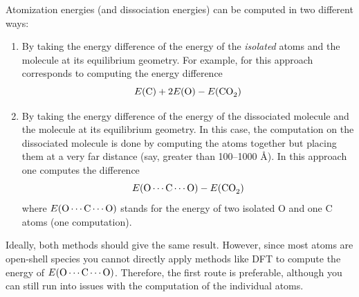\documentclass[../Main/notes.tex]{subfiles}
\begin{document}
Atomization energies (and dissociation energies) can be computed in two different ways:
\begin{enumerate}
\item By taking the energy difference of the energy of the \emph{isolated} atoms and the molecule at its equilibrium geometry. For example, for  this approach corresponds to computing the energy difference
\begin{equation}
E(\ce{C}) + 2 E(\ce{O}) - E(\ce{CO2})
\end{equation}
\item By taking the energy difference of the energy of the dissociated molecule and the molecule at its equilibrium geometry. In this case, the computation on the dissociated molecule is done by computing the atoms together but placing them at a very far distance (say, greater than 100--1000 \AA{}).
In this approach one computes the difference
\begin{equation}
E(\ce{O} \cdots \ce{C} \cdots \ce{O}) - E(\ce{CO2})
\end{equation}
where $E(\ce{O} \cdots \ce{C} \cdots \ce{O})$ stands for the energy of two isolated O and one C atoms (one computation).
\end{enumerate}
Ideally, both methods should give the same result. However, since most atoms are open-shell species you cannot directly apply methods like DFT to compute the energy of $E(\ce{O} \cdots \ce{C} \cdots \ce{O})$.
Therefore, the first route is preferable, although you can still run into issues with the computation of the individual atoms.
\end{document}
